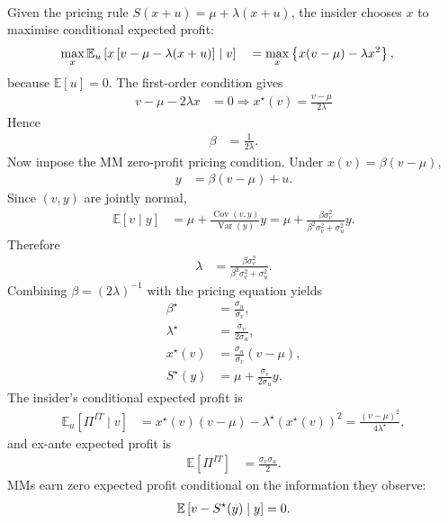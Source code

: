 \begin{model}
\par\smallskip\noindent{}\\
Given the pricing rule $S(x+u)=\mu+\lambda(x+u)$, the insider chooses $x$ to maximise conditional expected profit:
\begin{align*}
\max_x\mathbb{E}_u\left[x\left[v-\mu-\lambda(x+u)\right]\mid v\right] \quad
&=\max_x\left\{x(v-\mu)-\lambda x^2\right\},
\end{align*}
because $\mathbb{E}[u]=0$. The first-order condition gives
\begin{align*}
v-\mu-2\lambda x&=0 \Rightarrow x^\star(v)=\frac{v-\mu}{2\lambda}
\end{align*}
Hence
\begin{align*}
\beta&=\frac{1}{2\lambda}.
\end{align*}
Now impose the MM zero-profit pricing condition. Under $x(v)=\beta(v-\mu)$,
\begin{align*}
y&=\beta(v-\mu)+u.
\end{align*}
Since $(v,y)$ are jointly normal,
\begin{align*}
\mathbb{E}[v\mid y]
&=\mu+\frac{\operatorname{Cov}(v,y)}{\operatorname{Var}(y)}y=\mu+\frac{\beta\sigma_v^2}{\beta^2\sigma_v^2+\sigma_u^2}y.
\end{align*}
Therefore
\begin{align*}
\lambda&=\frac{\beta\sigma_v^2}{\beta^2\sigma_v^2+\sigma_u^2}.
\end{align*}
Combining $\beta=(2\lambda)^{-1}$ with the pricing equation yields
\begin{align*}
\beta^\star&=\frac{\sigma_u}{\sigma_v},\\
\lambda^\star&=\frac{\sigma_v}{2\sigma_u},\\
x^\star(v)&=\frac{\sigma_u}{\sigma_v}(v-\mu),\\
S^\star(y)&=\mu+\frac{\sigma_v}{2\sigma_u}y.
\end{align*}
The insider's conditional expected profit is
\begin{align*}
\mathbb{E}_u[\Pi^{IT}\mid v]
&=x^\star(v)(v-\mu)-\lambda^\star (x^\star(v))^2
=\frac{(v-\mu)^2}{4\lambda^\star},
\end{align*}
and ex-ante expected profit is
\begin{align*}
\mathbb{E}[\Pi^{IT}]&=\frac{\sigma_v\sigma_u}{2}.
\end{align*}
MMs earn zero expected profit conditional on the information they observe:
\begin{align*}
\mathbb{E}\left[v-S^\star(y)\mid y\right]=0.
\end{align*}


\end{model}
